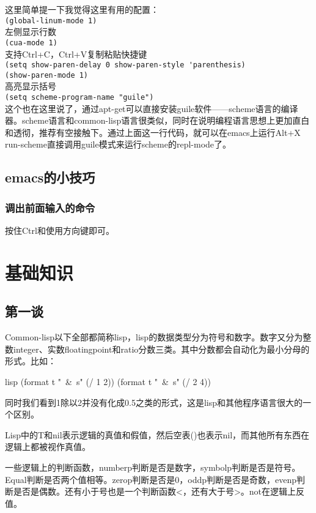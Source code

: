 \documentclass[11pt,oneside]{book}
\begin{document}
\begin{common-format}
这里简单提一下我觉得这里有用的配置：\\
\verb+(global-linum-mode 1)+\\
左侧显示行数\\
\verb+(cua-mode 1)+\\
支持Ctrl+C，Ctrl+V复制粘贴快捷键\\
\verb+(setq show-paren-delay 0 show-paren-style 'parenthesis)+\\
\verb+(show-paren-mode 1)+\\
高亮显示括号\\
\verb+(setq scheme-program-name "guile")+\\
这个也在这里说了，通过apt-get可以直接安装guile软件——scheme语言的编译器。scheme语言和common-lisp语言很类似，同时在说明编程语言思想上更加直白和透彻，推荐有空接触下。通过上面这一行代码，就可以在emacs上运行Alt+X run-scheme直接调用guile模式来运行scheme的repl-mode了。

\section{emacs的小技巧}
\subsection{调出前面输入的命令}
按住Ctrl和使用方向键即可。

\chapter{基础知识}
\section{第一谈}

Common-lisp以下全部都简称lisp，lisp的数据类型分为符号和数字\cite{touretzky2013common}。数字又分为整数integer、实数floatingpoint和ratio分数三类。其中分数都会自动化为最小分母的形式。比如：
\begin{xverbatim}[129]{lisp}
(format t  "~&~s" (/ 1 2))
(format t  "~&~s" (/ 2 4))
\end{xverbatim}
同时我们看到1除以2并没有化成0.5之类的形式，这是lisp和其他程序语言很大的一个区别。 

Lisp中的T和nil表示逻辑的真值和假值，然后空表()也表示nil，而其他所有东西在逻辑上都被视作真值。
 
一些逻辑上的判断函数，numberp判断是否是数字，symbolp判断是否是符号。Equal判断是否两个值相等。zerop判断是否是0，oddp判断是否是奇数，evenp判断是否是偶数。还有小于号也是一个判断函数<，还有大于号>。not在逻辑上反值。
 

\end{common-format}
\end{document}
